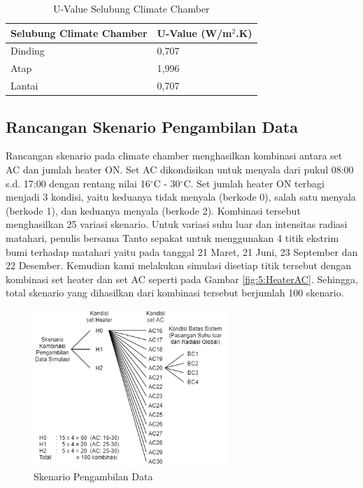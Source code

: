 \begin{table}[!h]
	\caption{U-Value Selubung Climate Chamber\cite{skripsiTanto}}
	\label{tbl:5:UValue}
	\centering
	\begin{tabular}{|p{5.7cm}|p{5cm}|}
		\hline
		\textbf{Selubung Climate Chamber} & \textbf{U-Value (W/m$^2$.K)} \\ \hline
		Dinding & 0,707 \\ \hline
		Atap & 1,996 \\ \hline 
		Lantai & 0,707 \\ \hline
	\end{tabular}
\end{table}

\subsection{Rancangan Skenario Pengambilan Data}
Rancangan skenario pada climate chamber menghasilkan kombinasi antara set AC dan jumlah heater ON. Set AC dikondisikan untuk menyala dari pukul 08:00 s.d. 17:00 dengan rentang nilai 16$^\circ$C - 30$^\circ$C. Set jumlah heater ON terbagi menjadi 3 kondisi, yaitu keduanya tidak menyala (berkode 0), salah satu menyala (berkode 1), dan keduanya menyala (berkode 2). Kombinasi tersebut menghasilkan 25 variasi skenario. Untuk variasi suhu luar dan intensitas radiasi matahari, penulis bersama Tanto sepakat untuk menggunakan 4 titik ekstrim bumi terhadap matahari yaitu pada tanggal 21 Maret, 21 Juni, 23 September dan 22 Desember. Kemudian kami melakukan simulasi disetiap titik tersebut dengan kombinasi set heater dan set AC seperti pada Gambar \ref{fig:5:HeaterAC}. Sehingga, total skenario yang dihasilkan dari kombinasi tersebut berjumlah 100 skenario.

\begin{figure}[!h]
	\centering
	\includegraphics[width=0.65\textwidth]{figures/SkenarioData}
	\caption{Skenario Pengambilan Data}
	\label{fig:5:SkenarioData}
\end{figure}

